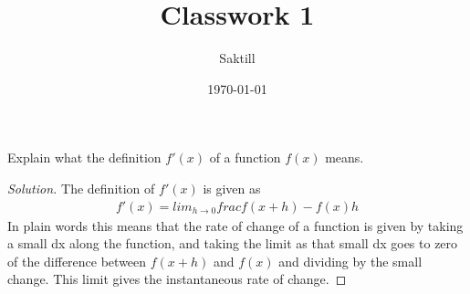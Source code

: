 \documentclass[aps,pra,notitlepage,amsmath,amssymb,letterpaper,12pt]{revtex4-1}
\newenvironment{problem}[2][Problem]{\begin{trivlist}
\item[\hskip \labelsep {\bfseries #1}\hskip \labelsep {\bfseries #2.}]}{\end{trivlist}}
\newenvironment{solution}{\begin{proof}[Solution]}{\end{proof}}
\begin{document}
 
\title{Classwork 1}
\author{Saktill}
\date{\today}

\maketitle

%
\begin{problem}{x.yz} 
Explain what the definition $f'(x)$ of a function $f(x)$ means.
\end{problem}
 
\begin{solution}
The definition of $f'(x)$ is given as
\[
\begin{split}
f'(x) =  lim_{h\to 0} frac{f(x+h) - f(x)}{h}
\end{split}
\]
In plain words this means that the rate of change of a function is given by taking a small dx along the function, and taking the limit as that small dx goes to zero of the difference between $f(x+h)$ and $f(x)$ and dividing by the small change. This limit gives the instantaneous rate of change.




\end{solution}








 
 
\end{document}
